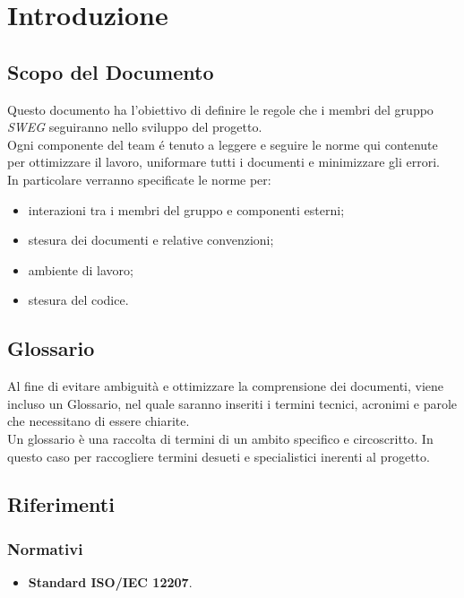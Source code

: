 \documentclass[12pt,a4paper,titlepage]{article}
\begin{document}
\section{Introduzione}
	\subsection{Scopo del Documento}
	Questo documento ha l'obiettivo di definire le regole che i membri del gruppo \textit{SWEG} seguiranno nello sviluppo del progetto.\\
	Ogni componente del team é tenuto a leggere e seguire le norme qui contenute per ottimizzare il lavoro, uniformare tutti i documenti e minimizzare gli errori.\\
	In particolare verranno specificate le norme per:
\begin{itemize}
\item interazioni tra i membri del gruppo e componenti esterni;
\item stesura dei documenti e relative convenzioni;
\item ambiente di lavoro;
\item stesura del codice.
\end{itemize}
\subsection{Glossario}
Al fine di evitare ambiguità e ottimizzare la comprensione dei documenti, viene incluso un Glossario, nel quale saranno inseriti i termini tecnici, acronimi e parole che necessitano di essere chiarite.\\
Un glossario è una raccolta di termini di un ambito specifico e circoscritto. In questo caso per raccogliere termini desueti e specialistici inerenti al progetto. 
\subsection{Riferimenti}
\subsubsection{Normativi}
\begin{itemize}
	\item \textbf{Standard ISO/IEC 12207}.
\end{itemize}
\end{document}

